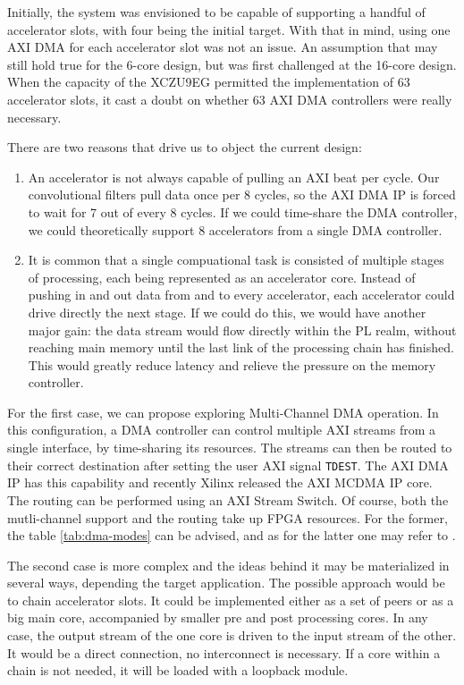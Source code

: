 Initially, the system was envisioned to be capable of supporting a handful of accelerator slots, with four being the initial target.
With that in mind, using one AXI DMA for each accelerator slot was not an issue. An assumption that may still hold true for the 6-core design,
but was first challenged at the 16-core design. When the capacity of the XCZU9EG permitted the implementation of 63 accelerator slots,
it cast a doubt on whether 63 AXI DMA controllers were really necessary.

There are two reasons that drive us to object the current design:

\begin{enumerate}
\item	An accelerator is not always capable of pulling an AXI \gls{beat} per cycle. 
	Our convolutional filters pull data once per 8 cycles, so the AXI DMA IP is forced to wait for 7 out of every 8 cycles.
	If we could time-share the DMA controller, we could theoretically support 8 accelerators from a single DMA controller.
\item	It is common that a single compuational task is consisted of multiple stages of processing, each being represented as an
	accelerator core. Instead of pushing in and out data from and to every accelerator, each accelerator could drive directly
	the next stage. If we could do this, we would have another major gain: the data stream would flow directly within the PL realm,
	without reaching main memory until the last link of the processing chain has finished. This would greatly reduce latency
	and relieve the pressure on the memory controller.
\end{enumerate}

For the first case, we can propose exploring Multi-Channel DMA operation. In this configuration, a DMA controller can control
multiple AXI streams from a single interface, by time-sharing its resources. The streams can then be routed to their correct
destination after setting the user AXI signal \texttt{TDEST}. The AXI DMA IP has this capability and recently Xilinx released
the AXI MCDMA IP core. The routing can be performed using an AXI Stream Switch. Of course, both the mutli-channel support and
the routing take up FPGA resources. For the former, the table \ref{tab:dma-modes} can be advised, and as for the latter
one may refer to \cite{pg085}.

The second case is more complex and the ideas behind it may be materialized in several ways, depending the target application.
The possible approach would be to chain accelerator slots. It could be implemented either as a set of peers or as a big main
core, accompanied by smaller pre and post processing cores. In any case, the output stream of the one core is driven to the
input stream of the other. It would be a direct connection, no interconnect is necessary. If a core within a chain is not needed,
it will be loaded with a loopback module.


